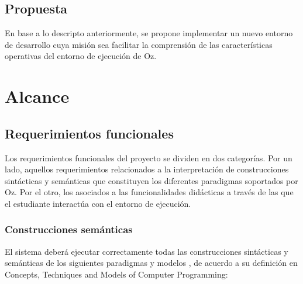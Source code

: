 \documentclass[a4paper,11pt]{article}
\begin{document}
\subsection{Propuesta}

En base a lo descripto anteriormente, se propone implementar un nuevo entorno
de desarrollo cuya misión sea facilitar la comprensión de las características
operativas del entorno de ejecución de Oz.

\section{Alcance}

\subsection{Requerimientos funcionales}

Los requerimientos funcionales del proyecto se dividen en dos categorías. Por
un lado, aquellos requerimientos relacionados a la interpretación de
construcciones sintácticas y semánticas que constituyen los diferentes
paradigmas soportados por Oz. Por el otro, los asociados a las funcionalidades
didácticas a través de las que el estudiante interactúa con el entorno de
ejecución.

\subsubsection{Construcciones semánticas}

El sistema deberá ejecutar correctamente todas las construcciones sintácticas y
semánticas de los siguientes paradigmas y modelos , de acuerdo a su definición
en Concepts, Techniques and Models of Computer Programming:
\end{document}
